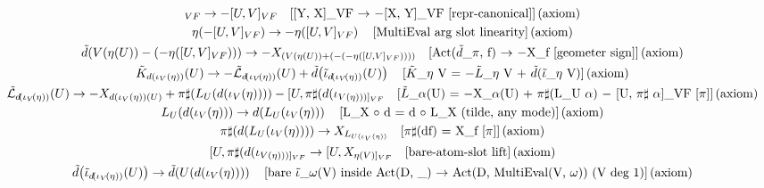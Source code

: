 \documentclass[11pt]{article}
\begin{document}
{\begin{gather*}
[V,U]_{VF} \to -[U,V]_{VF} \quad \text{[[Y, X]\_VF \ensuremath{\to} \ensuremath{-}[X, Y]\_VF  [repr-canonical]]\,(axiom)} \\
\eta\!\left(-[U,V]_{VF}\right) \to -\eta\!\left([U,V]_{VF}\right) \quad \text{[MultiEval arg slot linearity]\,(axiom)} \\
\tilde{d}\!\left(V\!\left(\eta\!\left(U\right)\right) - \left(-\eta\!\left([U,V]_{VF}\right)\right)\right) \to -X_{(V(\eta(U)) + (-(-\eta([U,V]_{VF}))))} \quad \text{[Act(\ensuremath{\tilde{d}}\_\ensuremath{\pi}, f) \ensuremath{\to} \ensuremath{-}X\_f  [geometer sign]]\,(axiom)} \\
\tilde{K}_{d(\iota_V(\eta))}\!\left(U\right) \to -\tilde{\mathcal{L}}_{d\!\left(\iota_V\!\left(\eta\right)\right)}\!\left(U\right) + \tilde{d}\!\left(\tilde{\iota}_{d\!\left(\iota_V\!\left(\eta\right)\right)}\!\left(U\right)\right) \quad \text{[\ensuremath{\tilde{K}}\_\ensuremath{\eta} V = \ensuremath{-}\ensuremath{\tilde{L}}\_\ensuremath{\eta} V + \ensuremath{\tilde{d}}(\ensuremath{\tilde{\ensuremath{\iota}}}\_\ensuremath{\eta} V)]\,(axiom)} \\
\tilde{\mathcal{L}}_{d\!\left(\iota_V\!\left(\eta\right)\right)}\!\left(U\right) \to -X_{d(\iota_V(\eta))(U)} + \pi\sharp\!\left(L_U\!\left(d\!\left(\iota_V\!\left(\eta\right)\right)\right)\right) - [U,\pi\sharp(d(\iota_{V(\eta)))]_{VF}} \quad \text{[\ensuremath{\tilde{L}}\_\ensuremath{\alpha}(U) = \ensuremath{-}X\_{\ensuremath{\alpha}(U)} + \ensuremath{\pi}\ensuremath{\sharp}(L\_U \ensuremath{\alpha}) \ensuremath{-} [U, \ensuremath{\pi}\ensuremath{\sharp} \ensuremath{\alpha}]\_VF [\ensuremath{\pi}]]\,(axiom)} \\
L_U\!\left(d\!\left(\iota_V\!\left(\eta\right)\right)\right) \to d\!\left(L_U\!\left(\iota_V\!\left(\eta\right)\right)\right) \quad \text{[L\_X \ensuremath{\circ} d = d \ensuremath{\circ} L\_X (tilde, any mode)]\,(axiom)} \\
\pi\sharp\!\left(d\!\left(L_U\!\left(\iota_V\!\left(\eta\right)\right)\right)\right) \to X_{L_{U(\iota_V(\eta))}} \quad \text{[\ensuremath{\pi}\ensuremath{\sharp}(df) = X\_f [\ensuremath{\pi}]]\,(axiom)} \\
[U,\pi\sharp(d(\iota_{V(\eta)))]_{VF}} \to [U,X_{\eta(V)]_{VF}} \quad \text{[bare-atom-slot lift]\,(axiom)} \\
\tilde{d}\!\left(\tilde{\iota}_{d\!\left(\iota_V\!\left(\eta\right)\right)}\!\left(U\right)\right) \to \tilde{d}\!\left(U\!\left(d\!\left(\iota_V\!\left(\eta\right)\right)\right)\right) \quad \text{[bare \ensuremath{\tilde{\ensuremath{\iota}}}\_\ensuremath{\omega}(V) inside Act(D, \_) \ensuremath{\to} Act(D, MultiEval(V, \ensuremath{\omega}))  (V deg 1)]\,(axiom)} \\

\end{gather*}}
\end{document}
